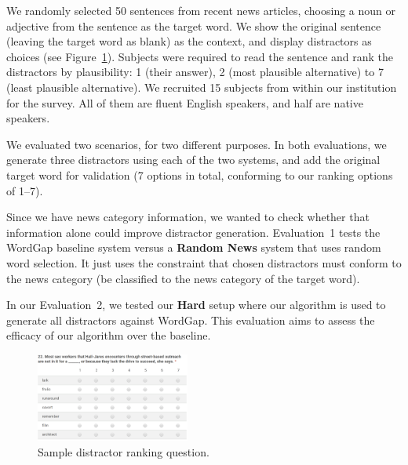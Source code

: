 We randomly selected 50 sentences from recent news articles, choosing
a noun or adjective from the sentence as the target word. We show the
original sentence (leaving the target word as blank) as the context,
and display distractors as choices (see
Figure~\ref{fig:distractor_1}). Subjects were required to read the
sentence and rank the distractors by plausibility: 1 (their answer), 2
(most plausible alternative) to 7 (least plausible alternative).
We recruited 15 subjects from within our institution for the survey. 
All of them are fluent English speakers, and half are native speakers.  
 
We evaluated two scenarios, for two different purposes. In both
evaluations, we generate three distractors using each of the two systems,
and add the original target word for validation (7 options in total,
conforming to our ranking options of 1--7).

Since we have news category information, we wanted to check whether
that information alone could improve distractor generation.
Evaluation~1 tests the WordGap baseline system versus a {\bf Random News}
system that uses random word selection.  It just uses the constraint
that chosen distractors must conform to the news category (be
classified to the news category of the target word).

In our Evaluation~2, we tested our {\bf Hard} setup where our
algorithm is used to generate all distractors against WordGap.  This
evaluation aims to assess the efficacy of our algorithm over the
baseline.



\begin{figure}[th]
   \centering
   \includegraphics[width=0.45\textwidth]{distractor_new.png}
   \caption{Sample distractor ranking question.}
   \label{fig:distractor_1}
\end{figure}



